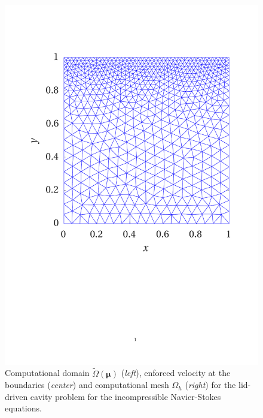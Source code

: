 \documentclass[longtitle]{elsarticle}
\numberwithin{equation}{section}
\theoremstyle{theorem}
\theoremstyle{definition}
\theoremstyle{remark}
\theoremstyle{proposition}
\numberwithin{figure}{section}
\newcommand{\wt}[1]{\widetilde{#1}}
\newcommand{\bg}[1]{\boldsymbol{#1}}
\begin{document}
\begin{figure}[t!]
\begin{minipage}{0.32\textwidth}
				\includegraphics[scale = 0.275, trim = {2cm 9cm 1.5cm 3.5cm}, clip]{dc_mesh}
			\end{minipage}

			\vspace*{-0.1cm}
			
			\caption{Computational domain $\wt{\Omega}(\bg{\mu})$ (\emph{left}), enforced velocity at the boundaries (\emph{center}) and computational mesh $\Omega_h$ (\emph{right}) for the lid-driven cavity problem for the incompressible Navier-Stokes equations.}
			\label{fig:dc-domain}
			

\end{figure}
\end{document}
